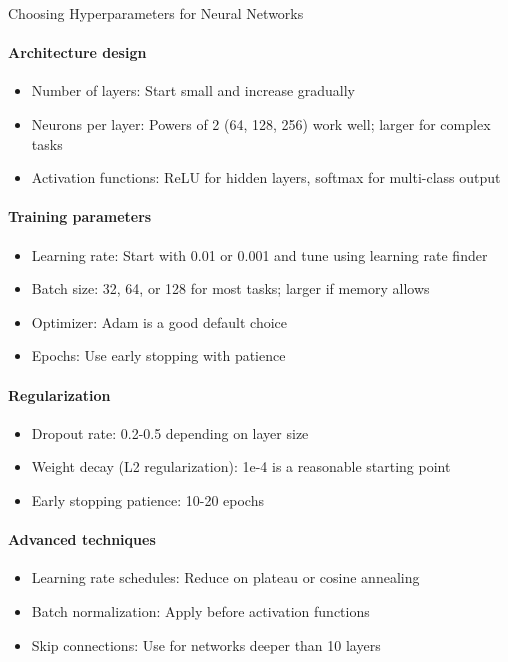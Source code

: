 \begin{KR}{Choosing Hyperparameters for Neural Networks}\\
\paragraph{Architecture design}
\begin{itemize}
    \item Number of layers: Start small and increase gradually
    \item Neurons per layer: Powers of 2 (64, 128, 256) work well; larger for complex tasks
    \item Activation functions: ReLU for hidden layers, softmax for multi-class output
\end{itemize}

\paragraph{Training parameters}
\begin{itemize}
    \item Learning rate: Start with 0.01 or 0.001 and tune using learning rate finder
    \item Batch size: 32, 64, or 128 for most tasks; larger if memory allows
    \item Optimizer: Adam is a good default choice
    \item Epochs: Use early stopping with patience
\end{itemize}

\paragraph{Regularization}
\begin{itemize}
    \item Dropout rate: 0.2-0.5 depending on layer size
    \item Weight decay (L2 regularization): 1e-4 is a reasonable starting point
    \item Early stopping patience: 10-20 epochs
\end{itemize}

\paragraph{Advanced techniques}
\begin{itemize}
    \item Learning rate schedules: Reduce on plateau or cosine annealing
    \item Batch normalization: Apply before activation functions
    \item Skip connections: Use for networks deeper than 10 layers
\end{itemize}
\end{KR}

